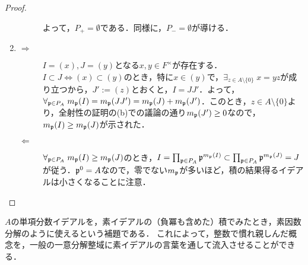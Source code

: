 \documentclass[uplatex,dvipdfmx]{jsreport}
\begin{document}
\begin{proof}
\begin{enumerate}
\begin{description}
            よって，$P_+=\emptyset$である．同様に，$P_-=\emptyset$が導ける．
        \end{description}
        \item
        \begin{description}
            \item[$\Rightarrow$] $I=(x),J=(y)$となる$x,y\in F^\times$が存在する．
            $I\subset J\Leftrightarrow(x)\subset(y)$のとき，特に$x\in(y)$で，$\exists_{z\in A\setminus\{0\}}\;x=yz$が成り立つから，$J':=(z)$とおくと，$I=JJ'$．よって，$\forall_{\mathfrak{p}\in P_A}\;m_{\mathfrak{p}}(I)=m_{\mathfrak{p}}(JJ')=m_{\mathfrak{p}}(J)+m_{\mathfrak{p}}(J')$．このとき，$z\in A\setminus\{0\}$より，全射性の証明の(b)での議論の通り$m_{\mathfrak{p}}(J')\ge 0$なので，$m_{\mathfrak{p}}(I)\ge m_{\mathfrak{p}}(J)$が示された．
            \item[$\Leftarrow$] $\forall_{\mathfrak{p}\in P_A}\;m_{\mathfrak{p}}(I)\ge m_{\mathfrak{p}}(J)$のとき，$I=\prod_{\mathfrak{p}\in P_A}\mathfrak{p}^{m_{\mathfrak{p}}(I)}\subset\prod_{\mathfrak{p}\in P_A}\mathfrak{p}^{m_{\mathfrak{p}}(J)}=J$が従う．$\mathfrak{p}^0=A$なので，零でない$m_{\mathfrak{p}}$が多いほど，積の結果得るイデアルは小さくなることに注意．
        \end{description}
    \end{enumerate}
\end{proof}
\begin{remarks}[素元ではなく単項素イデアルに注目する]
    $A$の単項分数イデアルを，素イデアルの（負冪も含めた）積でみたとき，素因数分解のように使えるという補題である．
    これによって，整数で慣れ親しんだ概念を，一般の一意分解整域に素イデアルの言葉を通して流入させることができる．
\end{remarks}
\end{document}
